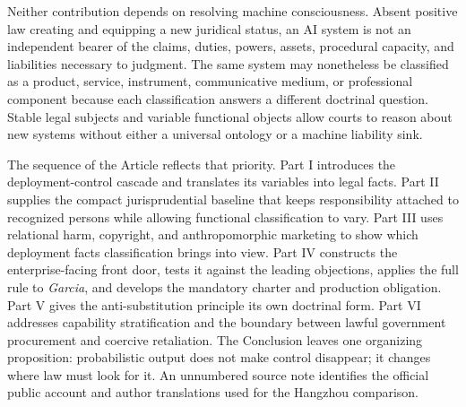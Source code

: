 Neither contribution depends on resolving machine consciousness. Absent positive law creating and equipping a new juridical status, an AI system is not an independent bearer of the claims, duties, powers, assets, procedural capacity, and liabilities necessary to judgment. The same system may nonetheless be classified as a product, service, instrument, communicative medium, or professional component because each classification answers a different doctrinal question. Stable legal subjects and variable functional objects allow courts to reason about new systems without either a universal ontology or a machine liability sink.

The sequence of the Article reflects that priority. Part I introduces the deployment-control cascade and translates its variables into legal facts. Part II supplies the compact jurisprudential baseline that keeps responsibility attached to recognized persons while allowing functional classification to vary. Part III uses relational harm, copyright, and anthropomorphic marketing to show which deployment facts classification brings into view. Part IV constructs the enterprise-facing front door, tests it against the leading objections, applies the full rule to \emph{Garcia}, and develops the mandatory charter and production obligation. Part V gives the anti-substitution principle its own doctrinal form. Part VI addresses capability stratification and the boundary between lawful government procurement and coercive retaliation. The Conclusion leaves one organizing proposition: probabilistic output does not make control disappear; it changes where law must look for it. An unnumbered source note identifies the official public account and author translations used for the Hangzhou comparison.
